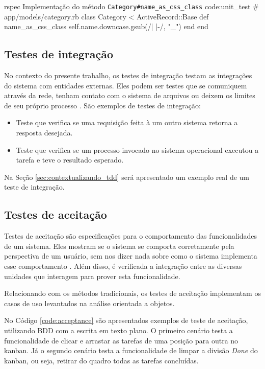 \begin{mycode}{rspec}%
{Implementação do método \texttt{Category\#name\_as\_css\_class} }{code:unit_test}
# app/models/category.rb
class Category < ActiveRecord::Base
  def name_as_css_class
    self.name.downcase.gsub(/\/| |-/, "_")
  end
end
\end{mycode}


\subsection{Testes de integração}
\label{sub:testes_de_integracao}

No contexto do presente trabalho, os testes de integração testam as integrações do sistema com entidades externas. Eles podem ser testes que se comuniquem através da rede, tenham contato com o sistema de arquivos ou deixem os limites de seu próprio processo \cite{ArtOfAgileDevelopment}. São exemplos de testes de integração:

\begin{itemize}
  \item Teste que verifica se uma requisição feita à um outro sistema retorna a resposta desejada.
  \item Teste que verifica se um processo invocado no sistema operacional executou a tarefa e teve o resultado esperado.
\end{itemize}

Na Seção \ref{sec:contextualizando_tdd} será apresentado um exemplo real de um teste de integração.

\subsection{Testes de aceitação}
\label{ssub:testes_de_aceitacao}

Testes de aceitação são especificações para o comportamento das funcionalidades de um sistema. Eles mostram se o sistema se comporta corretamente pela perspectiva de um usuário, sem nos dizer nada sobre como o sistema implementa esse comportamento \cite{TestDrivenKoskela}. Além disso, é verificada a integração entre as diversas unidades que interagem para prover esta funcionalidade.

Relacionando com os métodos tradicionais, os testes de aceitação implementam os casos de uso levantados na análise orientada a objetos.

No Código \ref{code:acceptance} são apresentados exemplos de teste de aceitação, utilizando BDD com a escrita em texto plano. O primeiro cenário testa a funcionalidade de clicar e arrastar as tarefas de uma posição para outra no kanban. Já o segundo cenário testa a funcionalidade de limpar a divisão \textit{Done} do kanban, ou seja, retirar do quadro todas as tarefas concluídas.


